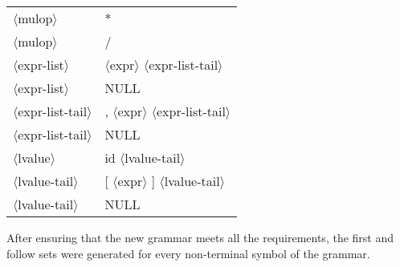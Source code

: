 \documentclass[11pt, fleqn]{article}
\newcommand{\atag}[1]{$\langle$#1$\rangle$}
\begin{document}
\begin{longtable}{l|l}
\atag{mulop}						&	*		\\
\atag{mulop}						&	/		\\
\atag{expr-list}					&	\atag{expr} \atag{expr-list-tail}		\\
\atag{expr-list}					&	NULL		\\
\atag{expr-list-tail}			&	, \atag{expr} \atag{expr-list-tail}		\\
\atag{expr-list-tail}			&	NULL		\\
\atag{lvalue}					&	id \atag{lvalue-tail}		\\
\atag{lvalue-tail}				&	[ \atag{expr} ] \atag{lvalue-tail}		\\
\atag{lvalue-tail}				&	NULL		\\
\end{longtable}

After ensuring that the new grammar meets all the requirements, the first and follow sets were generated for every non-terminal symbol of the grammar.
\end{document}
